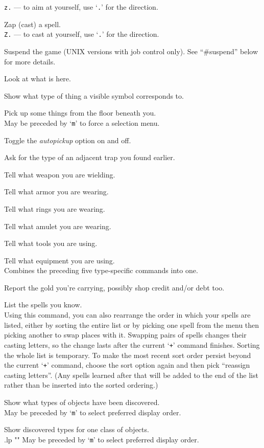 {\tt z.} --- to aim at yourself, use `{\tt .}' for the direction.
\item[\tb{Z}]
Zap (cast) a spell.\\
{\tt Z.} --- to cast at yourself, use `{\tt .}' for the direction.
\item[\tb{\^{}Z}]
Suspend the game (UNIX versions with job control only).
See ``\#suspend'' below for more details.
\item[\tb{:}]
Look at what is here.
\item[\tb{;}]
Show what type of thing a visible symbol corresponds to.
\item[\tb{,}]
Pick up some things from the floor beneath you.\\
May be preceded by `{\tt m}' to force a selection menu.
\item[\tb{@}]
Toggle the {\it autopickup\/} option on and off.
\item[\tb{\^{}}]
Ask for the type of an adjacent trap you found earlier.
\item[\tb{)}]
Tell what weapon you are wielding.
\item[\tb{[}]
Tell what armor you are wearing.
\item[\tb{=}]
Tell what rings you are wearing.
\item[\tb{"}]
Tell what amulet you are wearing.
\item[\tb{(}]
Tell what tools you are using.
\item[\tb{*}]
Tell what equipment you are using.\\
Combines the preceding five type-specific
commands into one.
\item[\tb{\$}]
Report the gold you're carrying, possibly shop credit and/or debt too.
\item[\tb{+}]
List the spells you know.\\
Using this command, you can also rearrange
the order in which your spells are listed, either by sorting the entire
list or by picking one spell from the menu then picking another to swap
places with it.  Swapping pairs of spells changes their casting letters,
so the change lasts after the current `{\tt +}' command finishes.  Sorting
the whole list is temporary.  To make the most recent sort order persist
beyond the current `{\tt +}' command, choose the sort option again and then
pick ``reassign casting letters''.  (Any spells learned after that will
be added to the end of the list rather than be inserted into the sorted
ordering.)
\item[\tb{$\backslash$}]
Show what types of objects have been discovered.
\\
May be preceded by `{\tt m}' to select preferred display order.
\item[\tb{\`}]
Show discovered types for one class of objects.
\\
.lp ""
May be preceded by `{\tt m}' to select preferred display order.

